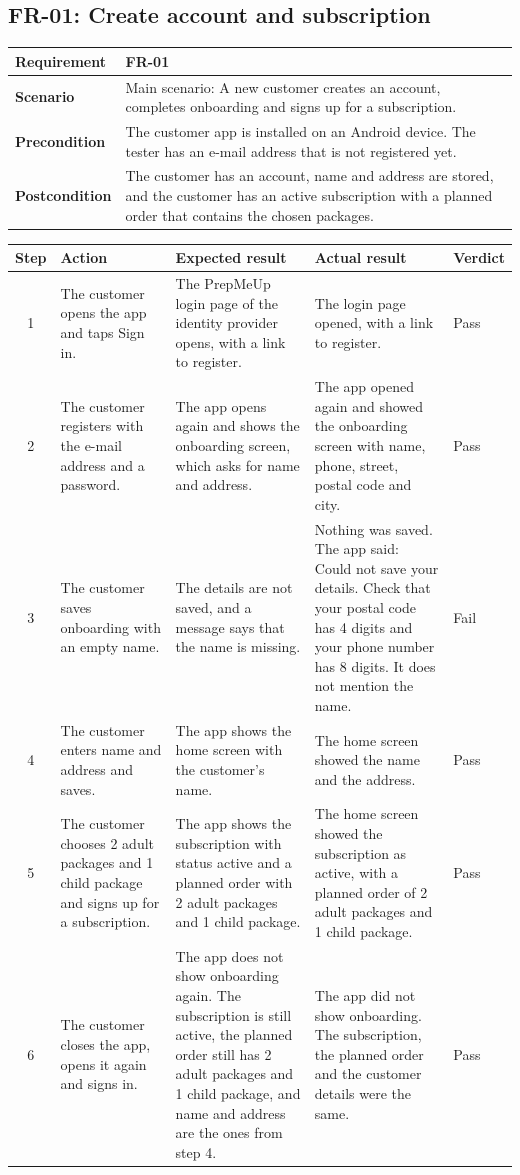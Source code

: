 \documentclass[a4paper,11pt]{article}
\newcommand{\scenarioinfo}[4]{%
  \noindent\begin{tabular}{|p{3cm}|p{12cm}|}
  \hline
  \textbf{Requirement} & \textbf{#1} \\
  \hline
  \textbf{Scenario} & #2 \\
  \hline
  \textbf{Precondition} & #3 \\
  \hline
  \textbf{Postcondition} & #4 \\
  \hline
  \end{tabular}\par\medskip}
\newenvironment{steps}{%
  \noindent\footnotesize
  \begin{tabular}{|c|p{3.6cm}|p{4.6cm}|p{3.2cm}|p{1.5cm}|}
  \hline
  \textbf{Step} & \textbf{Action} & \textbf{Expected result} & \textbf{Actual result} & \textbf{Verdict} \\
  \hline
}{%
  \end{tabular}\par\bigskip
}
\begin{document}
\subsection{FR-01: Create account and subscription}
\scenarioinfo{FR-01}
  {Main scenario: A new customer creates an account, completes onboarding and signs up for a subscription.}
  {The customer app is installed on an Android device. The tester has an e-mail address that is not registered yet.}
  {The customer has an account, name and address are stored, and the customer has an active subscription with a planned order that contains the chosen packages.}
\begin{steps}
1 & The customer opens the app and taps Sign in. & The PrepMeUp login page of the identity provider opens, with a link to register. & The login page opened, with a link to register. & Pass \\
\hline
2 & The customer registers with the e-mail address and a password. & The app opens again and shows the onboarding screen, which asks for name and address. & The app opened again and showed the onboarding screen with name, phone, street, postal code and city. & Pass \\
\hline
3 & The customer saves onboarding with an empty name. & The details are not saved, and a message says that the name is missing. & Nothing was saved. The app said: Could not save your details. Check that your postal code has 4 digits and your phone number has 8 digits. It does not mention the name. & Fail \\
\hline
4 & The customer enters name and address and saves. & The app shows the home screen with the customer's name. & The home screen showed the name and the address. & Pass \\
\hline
5 & The customer chooses 2 adult packages and 1 child package and signs up for a subscription. & The app shows the subscription with status active and a planned order with 2 adult packages and 1 child package. & The home screen showed the subscription as active, with a planned order of 2 adult packages and 1 child package. & Pass \\
\hline
6 & The customer closes the app, opens it again and signs in. & The app does not show onboarding again. The subscription is still active, the planned order still has 2 adult packages and 1 child package, and name and address are the ones from step 4. & The app did not show onboarding. The subscription, the planned order and the customer details were the same. & Pass \\
\hline
\end{steps}
\end{document}
